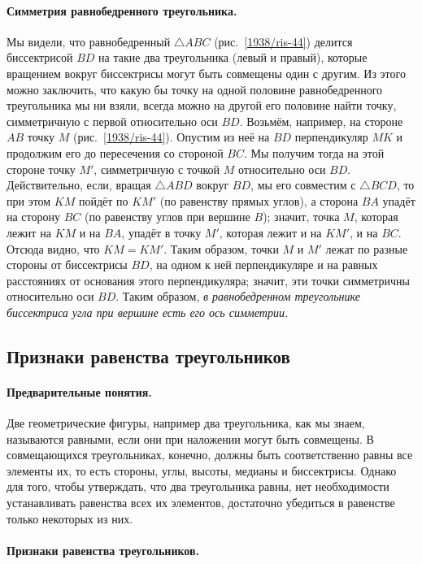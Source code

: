 \documentclass[twoside]{book}
\begin{document}
\paragraph{Симметрия равнобедренного треугольника.}\label{1938/40}
Мы видели, что равнобедренный $\triangle ABC$ (рис.~\ref{1938/ris-44}) делится биссектрисой $BD$ на такие два треугольника (левый и правый), которые вращением вокруг биссектрисы могут быть совмещены один с другим.
Из этого можно заключить, что какую бы точку на одной половине равнобедренного треугольника мы ни взяли, всегда можно на другой его половине найти точку, симметричную с первой относительно оси $BD$.
Возьмём, например, на стороне $AB$ точку $M$ (рис.~\ref{1938/ris-44}).
Опустим из неё на $BD$ перпендикуляр $MK$ и продолжим его до пересечения со стороной $BC$.
Мы получим тогда на этой стороне точку $M'$, симметричную с точкой $M$ относительно оси $BD$.
Действительно, если, вращая $\triangle ABD$ вокруг $BD$, мы его совместим с $\triangle BCD$, то при этом $KM$ пойдёт по $KM'$ (по равенству прямых углов), а сторона $BA$ упадёт на сторону $BC$ (по равенству углов при вершине $B$);
значит, точка $M$, которая лежит на $KM$ и на $BA$, упадёт в точку $M'$, которая лежит и на $KM'$, и на $BC$.
Отсюда видно, что $KM=KM'$.
Таким образом, точки $M$ и $M'$ лежат по разные стороны от биссектрисы $BD$, на одном к ней перпендикуляре и на равных расстояниях от основания этого перпендикуляра;
значит, эти точки симметричны относительно оси $BD$.
Таким образом, \emph{в равнобедренном треугольнике биссектриса угла при вершине есть его ось симметрии.}


\subsection*{Признаки равенства треугольников}

\paragraph{Предварительные понятия.}\label{1938/41}
Две геометрические фигуры, например два треугольника, как мы знаем, называются равными, если они при наложении могут быть совмещены.
В совмещающихся треугольниках, конечно, должны быть соответственно равны все элементы их, то есть стороны, углы, высоты, медианы и биссектрисы.
Однако для того, чтобы утверждать, что два треугольника равны, нет необходимости устанавливать равенства всех их элементов, достаточно убедиться в равенстве только некоторых из них.


\paragraph{Признаки равенства треугольников.}\label{1938/42}\ 
\end{document}
